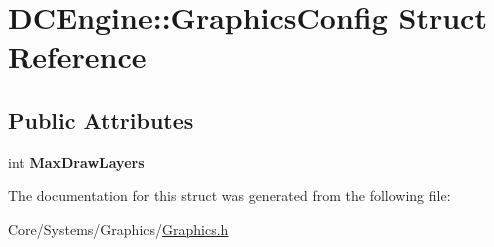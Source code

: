 \hypertarget{structDCEngine_1_1GraphicsConfig}{\section{D\-C\-Engine\-:\-:Graphics\-Config Struct Reference}
\label{structDCEngine_1_1GraphicsConfig}
}
\subsection*{Public Attributes}
\begin{DoxyCompactItemize}
\item 
\hypertarget{structDCEngine_1_1GraphicsConfig_af44e9e84eb937afeff2c8ec4177b8e26}{int {\bfseries Max\-Draw\-Layers}}\label{structDCEngine_1_1GraphicsConfig_af44e9e84eb937afeff2c8ec4177b8e26}

\end{DoxyCompactItemize}


The documentation for this struct was generated from the following file\-:\begin{DoxyCompactItemize}
\item 
Core/\-Systems/\-Graphics/\hyperlink{Graphics_8h}{Graphics.\-h}\end{DoxyCompactItemize}
